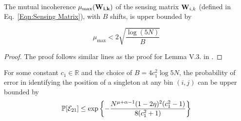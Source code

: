\begin{lemma}[Mutual Incoherence Bound for sub-sampled IDFT matrix  [\cite{pawar2014robust},Proposition~A.1]
\label{lemma:MutualCoherence}
	The mutual incoherence $\mu_{\text{max}} (\mathbf{W_{i,k}})$ of the sensing matrix $\mathbf{W}_{i,k}$ (defined in Eq.~\ref{Eqn:Sensing Matrix}), with $B$ shifts, is upper bounded by
	
	\[ \mu_{\text{max}} < 2\sqrt{\frac{\log(5N)}{B}} \] 
	
\end{lemma}
\begin{proof}
	The proof follows similar lines as the proof for Lemma V.3. in \cite{pawar2014robust}.
\end{proof}
 
\begin{lemma}
For some constant $c_1 \in \mathbb{R}$ and the choice of $B=4c_1^2\log 5N$,  the probability of error in identifying the position of a singleton at any bin $(i,j)$ can be upper bounded by
\begin{align*}
\mathbb{P}[\mathcal{E}_{21}]\leq \exp\left\lbrace-\frac{N^{\mu+\alpha-1}(1-2\eta)^2(c_1^2-1)}{8(c_1^2+1)}\right\rbrace
\end{align*}
\end{lemma}
